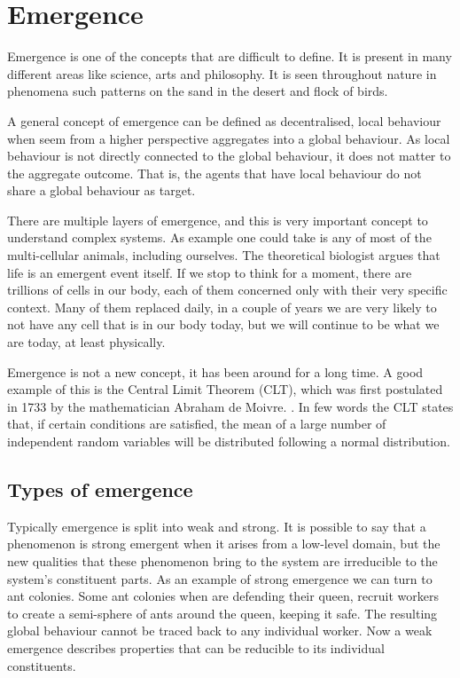 \section{Emergence}

Emergence is one of the concepts that are difficult to define. It is present in many different areas like science, arts and philosophy. It is seen throughout nature in phenomena such patterns on the sand in the desert and flock of birds.

A general concept of emergence can be defined as decentralised, local behaviour when seem from a higher perspective aggregates into a global behaviour. As local behaviour is not directly connected to the global behaviour, it does not matter to the aggregate outcome. That is, the agents that have local behaviour do not share a global behaviour as target.

There are multiple layers of emergence, and this is very important concept to understand complex systems.\cite{miller2007complex} As example one could take is any of most of the multi-cellular animals, including ourselves. The theoretical biologist \citeauthor{life1010034} argues that life is an emergent event itself. If we stop to think for a moment, there are trillions of cells in our body, each of them concerned only with their very specific context. Many of  them replaced daily, in a couple of years we are very likely to not have any cell that is in our body today, but we will continue to be what we are today, at least physically.

Emergence is not a new concept, it has been around for a long time. A good example of this is the Central Limit Theorem (CLT), which was first postulated in 1733 by the mathematician Abraham de Moivre. \cite{tijms2007understanding}. In few words the CLT states that, if certain conditions are satisfied, the mean of a large number of independent random variables will be distributed following a normal distribution.

\subsection{Types of emergence}

Typically emergence is split into weak and strong. It is possible to say that a phenomenon is strong emergent when it arises from a low-level domain, but the new qualities that these phenomenon bring to the system are irreducible to the system's constituent parts.\cite{laughlin2008different} As an example of strong emergence we can turn to ant colonies. Some ant colonies when are defending their queen, recruit workers to create a semi-sphere of ants around the queen, keeping it safe. The resulting global behaviour cannot be traced back to any individual worker. Now a weak emergence describes properties that can be reducible to its individual constituents. 


